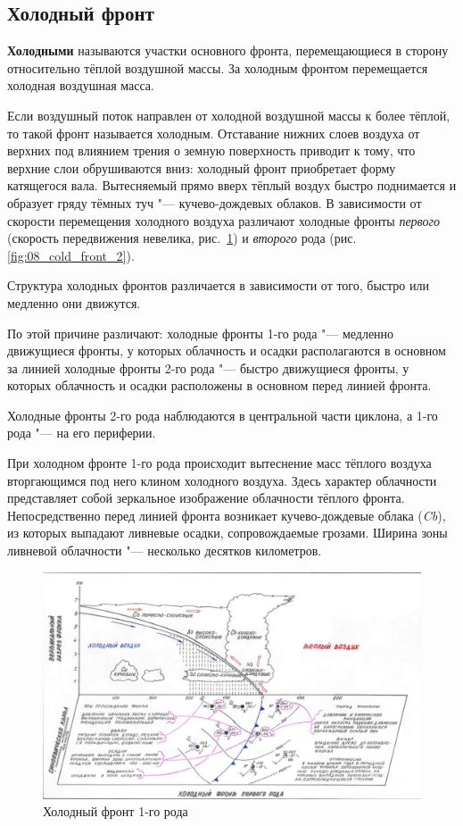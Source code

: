\documentclass[a4paper, 12pt, twoside, final, book, russian, fittopage, cyremdash, openright]{ncc}
\begin{document}
\subsection{Холодный фронт}
\label{sec:cold_front}

\textbf{Холодными} называются участки основного фронта, перемещающиеся в
сторону относительно тёплой воздушной массы. За холодным фронтом
перемещается холодная воздушная масса.

Если воздушный поток направлен от холодной воздушной массы к более
тёплой, то такой фронт называется холодным. Отставание нижних слоев
воздуха от верхних под влиянием трения о земную поверхность приводит к
тому, что верхние слои обрушиваются вниз: холодный фронт приобретает
форму катящегося вала. Вытесняемый прямо вверх тёплый воздух быстро
поднимается и образует гряду тёмных туч "--- кучево-дождевых
облаков. В зависимости от скорости перемещения холодного воздуха
различают холодные фронты \textit{первого} (скорость передвижения
невелика, рис.~\ref{fig:07_cold_front_1}) и \textit{второго} рода
(рис.\ref{fig:08_cold_front_2}).

Структура холодных фронтов различается в зависимости от того, быстро
или медленно они движутся.

По этой причине различают: холодные фронты 1-го
рода "--- медленно движущиеся фронты,
у которых облачность и осадки располагаются в основном за линией
холодные фронты 2-го рода "--- быстро
движущиеся фронты, у которых облачность и осадки расположены в
основном перед линией фронта.

Холодные фронты 2-го рода наблюдаются в центральной части
циклона, а 1-го рода "--- на его периферии.

При холодном фронте 1-го рода происходит вытеснение масс тёплого
воздуха вторгающимся под него клином холодного воздуха. Здесь характер
облачности представляет собой зеркальное изображение облачности
тёплого фронта. Непосредственно перед линией фронта возникает
кучево-дождевые облака (\textit{Cb}), из которых выпадают ливневые осадки,
сопровождаемые грозами. Ширина зоны ливневой облачности "--- несколько
десятков километров.

\begin{figure}[htb]
   \centering
   \includegraphics[scale=0.7]{07_cold_front_1.pdf}
   \caption{Холодный фронт 1-го рода}
   \label{fig:07_cold_front_1}
\end{figure}
\end{document}

